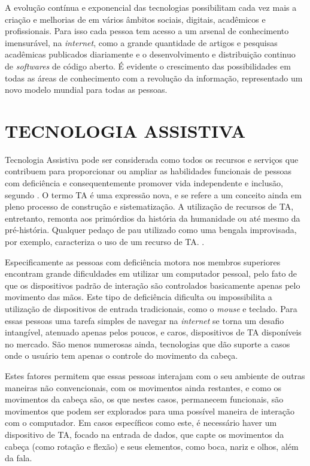 A evolução contínua e exponencial das tecnologias possibilitam cada vez mais a criação e melhorias de em vários âmbitos sociais, digitais, acadêmicos e profissionais. Para isso cada pessoa tem acesso a um arsenal de conhecimento imensurável, na \textit{internet}, como a grande quantidade de artigos e pesquisas acadêmicas publicados diariamente e o desenvolvimento e distribuição continuo de \textit{softwares} de código aberto. É evidente o crescimento das possibilidades em todas as áreas de conhecimento com a revolução da informação, representado um novo modelo mundial para todas as pessoas.

\section{TECNOLOGIA ASSISTIVA}\label{Sub:ta-brasil}
Tecnologia Assistiva pode ser considerada como todos os recursos e serviços que contribuem para proporcionar ou ampliar as habilidades funcionais de pessoas com deficiência e consequentemente promover vida independente e inclusão, segundo . O termo TA é uma expressão nova, e se refere a um conceito ainda em pleno processo de construção e sistematização. A utilização de recursos de TA, entretanto, remonta aos primórdios da história da humanidade ou até mesmo da pré-história. Qualquer pedaço de pau utilizado como uma bengala improvisada, por exemplo, caracteriza o uso de um recurso de TA. \cite{galvao2009tecnologia-UPPERCASE}.

Especificamente as pessoas com deficiência motora nos membros superiores encontram grande dificuldades em utilizar um computador pessoal, pelo fato de que os dispositivos padrão de interação são controlados basicamente apenas pelo movimento das mãos. Este tipo de deficiência dificulta ou impossibilita a utilização de dispositivos de entrada tradicionais, como o \textit{mouse} e teclado. Para essas pessoas uma tarefa simples de navegar na \textit{internet} se torna um desafio intangível, atenuado apenas pelos poucos, e caros, dispositivos de TA disponíveis no mercado. São menos numerosas ainda, tecnologias que dão suporte a casos onde o usuário tem apenas o controle do movimento da cabeça. 


Estes fatores permitem que essas pessoas interajam com o seu ambiente de outras maneiras não convencionais, com os movimentos ainda restantes, e como os movimentos da cabeça são, os que nestes casos, permanecem funcionais, são movimentos que podem ser explorados para uma possível maneira de interação com o computador. Em casos específicos como este, é necessário haver um dispositivo de TA, focado na entrada de dados, que capte os movimentos da cabeça (como rotação e flexão) e seus elementos, como boca, nariz e olhos, além da fala. 

